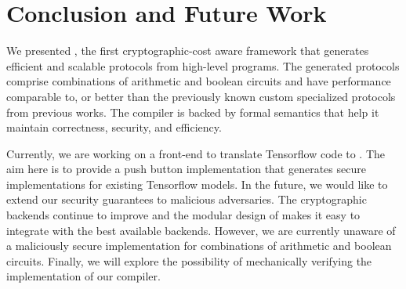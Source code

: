 \section{Conclusion and Future Work}
\label{sec:conclude}

We presented \tool, the first
cryptographic-cost aware framework that generates efficient and
scalable \mpc protocols from high-level programs.
The generated protocols comprise combinations
of arithmetic and boolean circuits and have performance comparable to, or better than the previously known custom specialized
protocols from previous works.
The compiler is backed by formal semantics that help 
it maintain correctness, security,
and efficiency.

Currently, we are working on a front-end to translate Tensorflow code to \tool. The aim here is to provide a push button implementation  that generates secure implementations for existing Tensorflow models.  
In the future, we would like to extend our security guarantees to malicious adversaries. 
 The cryptographic backends continue to improve and the modular design of \tool makes it easy to integrate with the best available backends.
However, we are currently unaware of a maliciously secure \mpc implementation for combinations of
arithmetic and boolean circuits.
Finally, we will explore the possibility of mechanically verifying the implementation of our compiler.







